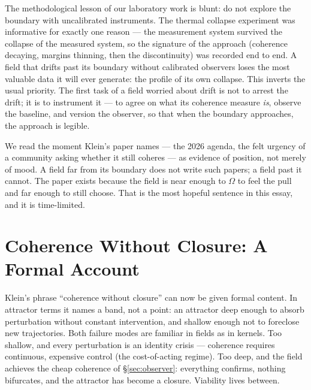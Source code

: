 \documentclass[12pt]{article}
\begin{document}
The methodological lesson of our laboratory work is blunt: do not explore the
boundary with uncalibrated instruments. The thermal collapse experiment was
informative for exactly one reason --- the measurement system survived the
collapse of the measured system, so the signature of the approach (coherence
decaying, margins thinning, then the discontinuity) was recorded end to end.
A field that drifts past its boundary without calibrated observers loses the
most valuable data it will ever generate: the profile of its own collapse.
This inverts the usual priority. The first task of a field worried about
drift is not to arrest the drift; it is to instrument it --- to agree on
what its coherence measure \emph{is}, observe the baseline, and version the
observer, so that when the boundary approaches, the approach is legible.

We read the moment Klein's paper names --- the 2026 agenda, the felt urgency
of a community asking whether it still coheres --- as evidence of position,
not merely of mood. A field far from its boundary does not write such papers;
a field past it cannot. The paper exists because the field is near enough to
$\Omega$ to feel the pull and far enough to still choose. That is the most
hopeful sentence in this essay, and it is time-limited.

\section{Coherence Without Closure: A Formal Account}
\label{sec:coherence}


Klein's phrase ``coherence without closure'' can now be given formal content.
In attractor terms it names a band, not a point: an attractor deep enough to
absorb perturbation without constant intervention, and shallow enough not to
foreclose new trajectories. Both failure modes are familiar in fields as in
kernels. Too shallow, and every perturbation is an identity crisis ---
coherence requires continuous, expensive control (the cost-of-acting regime).
Too deep, and the field achieves the cheap coherence of \S\ref{sec:observer}:
everything confirms, nothing bifurcates, and the attractor has become a
closure. Viability lives between.
\end{document}
